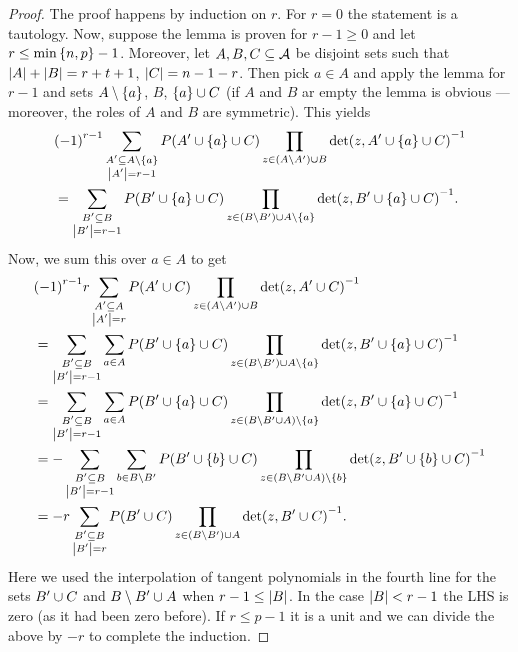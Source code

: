 \begin{proof}
    The proof happens by induction on $r$. For $r=0$ the statement is a
    tautology.
    Now, suppose the lemma is proven for $r-1\geq 0$ and let
    $r\leq\min\left\{n,p\right\}-1$.
    Moreover, let $A,B,C\subseteq \mathcal{A}$ be disjoint sets such
    that $\left|A\right|+\left|B\right|=r+t+1$, $\left|C\right|=n-1-r$. Then pick $a\in A$ and
    apply the lemma for $r-1$ and sets $A\setminus\left\{a\right\}$, $B$,
    $\left\{a\right\}\cup C$ (if $A$ and $B$ ar empty the lemma is obvious --- moreover, the roles of $A$ and $B$ are symmetric).
    This yields
    \begin{align*}
        &{(-1)}^{r-1}\sum_{\substack{A'\subseteq A\setminus\left\{a\right\}\\ \left|A'\right|=r-1}}{P(A'\cup\left\{a\right\}\cup C)\prod_{z\in (A\setminus A')\cup B}{{\det(z,A'\cup\left\{a\right\}\cup C)}^{-1}}}\\
        &= \sum_{\substack{B'\subseteq B\\ \left|B'\right|=r-1}}{P(B'\cup\left\{a\right\}\cup C)\prod_{z\in (B\setminus B')\cup A\setminus\left\{a\right\}}{{\det(z,B'\cup\left\{a\right\}\cup C)}^{-1}}}\text{.}
    \end{align*}
    Now, we sum this over $a\in A$ to get
    \begin{align*}
        &{(-1)}^{r-1}r\sum_{\substack{A'\subseteq A\\ \left|A'\right|=r}}{P(A'\cup C)\prod_{z\in (A\setminus A')\cup B}{{\det(z,A'\cup C)}^{-1}}}\\
        &= \sum_{\substack{B'\subseteq B\\ \left|B'\right|=r-1}}{\sum_{a\in A}{P(B'\cup\left\{a\right\}\cup C)\prod_{z\in (B\setminus B')\cup A\setminus\left\{a\right\}}{{\det(z,B'\cup\left\{a\right\}\cup C)}^{-1}}}}\\
        &= \sum_{\substack{B'\subseteq B\\ \left|B'\right|=r-1}}{\sum_{a\in A}{P(B'\cup\left\{a\right\}\cup C)\prod_{z\in (B\setminus B'\cup A)\setminus\left\{a\right\}}{{\det(z,B'\cup\left\{a\right\}\cup C)}^{-1}}}}\\
        &= -\sum_{\substack{B'\subseteq B\\ \left|B'\right|=r-1}}{\sum_{b\in B\setminus B'}{P(B'\cup\left\{b\right\}\cup C)\prod_{z\in(B\setminus B'\cup A)\setminus\left\{b\right\}}{{\det(z,B'\cup\left\{b\right\}\cup C)}^{-1}}}}\\
        &= -r\sum_{\substack{B'\subseteq B\\ \left|B'\right|=r}}{P(B'\cup C)\prod_{z\in (B\setminus B')\cup A}{{\det(z,B'\cup C)}^{-1}}}\text{.}
    \end{align*}
    Here we used the interpolation of tangent polynomials in the fourth
    line for the sets $B'\cup C$ and $B\setminus B'\cup A$ when
    $r-1\leq\left|B\right|$. In the case $\left|B\right|< r-1$ the LHS is zero (as it
    had been zero before).
    If $r\leq p-1$ it is a unit and we can divide the above by $-r$ to complete
    the induction.
\end{proof}

